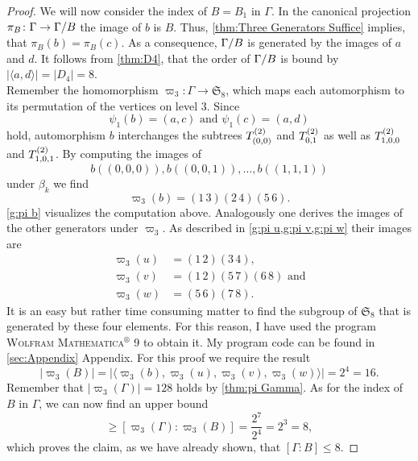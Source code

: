 \begin{proof}
We will now consider the index of $B=B_1$ in $\Gamma$. In the canonical projection $\pi_B\colon\Gamma\to\nicefrac{\Gamma}{B}$ the image of $b$ is $B$. Thus, \cref{thm:Three Generators Suffice} implies, that $\pi_B(b)=\pi_B(c)$. As a consequence, $\nicefrac{\Gamma}{B}$ is generated by the images of $a$ and $d$. It follows from \cref{thm:D4}, that the order of $\nicefrac{\Gamma}{B}$ is bound by $\lvert\langle a,d\rangle\rvert=\lvert D_4\rvert=8$.\\
Remember the homomorphism $\varpi_3\colon\Gamma\to\mathfrak{S}_8$, which maps each automorphism to its permutation of the vertices on level 3. Since
\begin{equation*}
\psi_1(b)=(a,c)\text{ and }\psi_1(c)=(a,d)
\end{equation*}
hold, automorphism $b$ interchanges the subtrees $\ST{(0,0)}$ and $\ST{0,1}$ as well as $\ST{1,0,0}$ and $\ST{1,0,1}$. By computing the images of 
\begin{equation*}
b((0,0,0)),b((0,0,1)),\ldots,b((1,1,1))
\end{equation*}
 under $\beta_k$ we find
\begin{equation*}
\varpi_3(b)=(1\,3)(2\,4)(5\,6).
\end{equation*}
\cref{g:pi b} visualizes the computation above. Analogously one derives the images of the other generators under $\varpi_3$. As described in \cref{g:pi u,g:pi v,g:pi w} their images are
\begin{align*}
\varpi_3(u)	&=(1\,2)(3\,4),\\
\varpi_3(v)	&=(1\,2)(5\,7)(6\,8)\text{ and}\\
\varpi_3(w)	&=(5\,6)(7\,8).
\end{align*}
It is an easy but rather time consuming matter to find the subgroup of $\mathfrak{S}_8$ that is generated by these four elements. For this reason, I have used the program \textsc{Wolfram Mathematica$^\circledR$ 9} to obtain it. My program code can be found in \ref{sec:Appendix} Appendix. For this proof we require the result
\begin{equation*}
\lvert\varpi_3(B)\rvert=\lvert\langle\varpi_3(b),\varpi_3(u),\varpi_3(v),\varpi_3(w)\rangle\rvert=2^4=16.
\end{equation*}
Remember that $\lvert \varpi_3(\Gamma)\rvert=128$ holds by \cref{thm:pi Gamma}. As for the index of $B$ in $\Gamma$, we can now find an upper bound
\begin{equation*}
[\Gamma:B]\geq [\varpi_3(\Gamma):\varpi_3(B)]=\frac{2^7}{2^4}=2^3=8,
\end{equation*}
which proves the claim, as we have already shown, that $[\Gamma:B]\leq 8$.
\end{proof}


